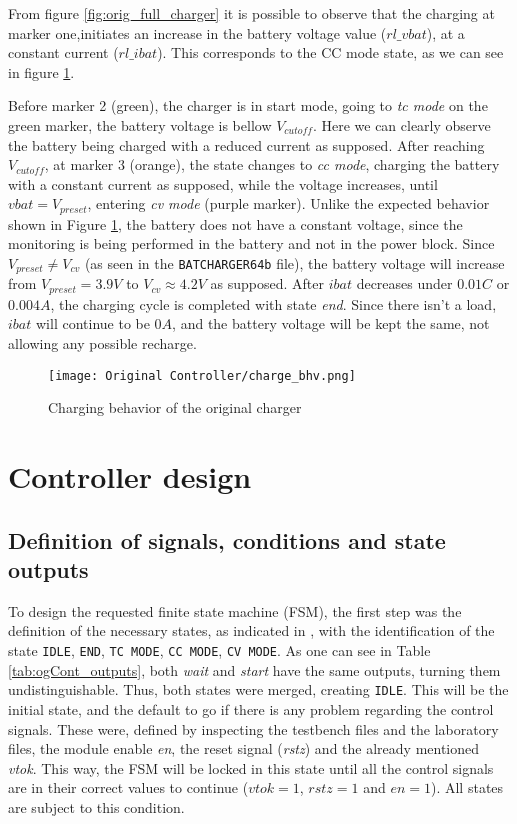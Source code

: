 \documentclass[12pt]{article}
\begin{document}
From figure \ref{fig:orig_full_charger} it is possible to observe that the charging at marker one,initiates an increase in the battery voltage value ($rl\_vbat$), at a constant current ($rl\_ibat$). This corresponds to the CC mode state, as we can see in figure \ref{fig:orig_full_behavior}. 

Before marker 2 (green), the charger is in start mode, going to \textit{tc mode} on the green marker, the battery voltage is bellow $V_{cutoff}$. Here we can clearly observe the battery being charged with a reduced current as supposed. After reaching $V_{cutoff}$, at marker 3 (orange), the state changes to \textit{cc mode}, charging the battery with a constant current as supposed, while the voltage increases, until $vbat=V_{preset}$, entering \textit{cv mode} (purple marker). Unlike the expected behavior shown in Figure \ref{fig:orig_full_behavior}, the battery does not have a constant voltage, since the monitoring is being performed in the battery and not in the power block. Since $V_{preset}\not=V_{cv}$ (as seen in the \texttt{BATCHARGER64b} file), the battery voltage will increase from $V_{preset}=3.9V$ to $V_{cv}\approx4.2V$ as supposed. After $ibat$ decreases under $0.01C$ or $0.004A$, the charging cycle is completed with state \textit{end}. Since there isn't a load, $ibat$ will continue to be $0A$, and the battery voltage will be kept the same, not allowing any possible recharge.

\begin{figure}[H]
    \centering 
    \texttt{[image: Original Controller/charge\_bhv.png]}
    \caption{Charging behavior of the original charger}
    \label{fig:orig_full_behavior}
\end{figure}

\section{Controller design}

\subsection{Definition of signals, conditions and state outputs}
To design the requested finite state machine (FSM), the first step was the definition of the necessary states, as indicated in \cite{batchargerPaper}, with the identification of the state \texttt{IDLE}, \texttt{END}, \texttt{TC MODE}, \texttt{CC MODE}, \texttt{CV MODE}. As one can see in Table \ref{tab:ogCont_outputs}, both \textit{wait} and \textit{start} have the same outputs, turning them undistinguishable. Thus, both states were merged, creating \texttt{IDLE}. This will be the initial state, and the default to go if there is any problem regarding the control signals. These were, defined by inspecting the testbench files and the laboratory files, the module enable \textit{en}, the reset signal (\textit{rstz}) and the already mentioned \textit{vtok}. This way, the FSM will be locked in this state until all the control signals are in their correct values to continue ($vtok=1$, $rstz=1$ and $en=1$). All states are subject to this condition.
\end{document}
